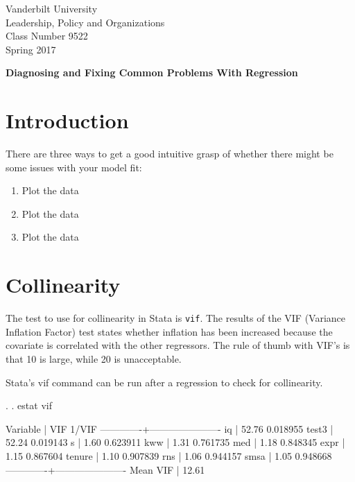 \documentclass[12pt]{article}
\begin{document}
\thispagestyle{empty}%


\setlength{\parskip}{1ex plus 0.5ex minus 0.2ex}

\setcounter{secnumdepth}{-2}



\begin{flushleft}
Vanderbilt University\\Leadership, Policy and Organizations\\Class Number 9522\\ Spring 2017\\
\end{flushleft}

\begin{center}
\textbf{Diagnosing and Fixing Common Problems With Regression}
\end{center}

\section{Introduction}
\label{sec:introduction}

There are three ways to get a good intuitive grasp of whether there
might be some issues with your model fit:

\begin{enumerate}
\item Plot the data

\item Plot the data

\item Plot the data
\end{enumerate}


\section{Collinearity}
\label{sec:collinearity}

The test to use for collinearity in Stata is \texttt{vif}. The results
of the VIF (Variance Inflation Factor) test states whether inflation
has been increased because the covariate is correlated with the other
regressors. The rule of thumb with VIF's is that 10 is large, while 20
is unacceptable. 

Stata's vif command can be run after a regression to check for
collinearity. 

\begin{stlog}
  
. 
. estat vif

    Variable |       VIF       1/VIF  
-------------+----------------------
          iq |     52.76    0.018955
       test3 |     52.24    0.019143
           s |      1.60    0.623911
         kww |      1.31    0.761735
         med |      1.18    0.848345
        expr |      1.15    0.867604
      tenure |      1.10    0.907839
         rns |      1.06    0.944157
        smsa |      1.05    0.948668
-------------+----------------------
    Mean VIF |     12.61

\end{stlog}
\end{document}

